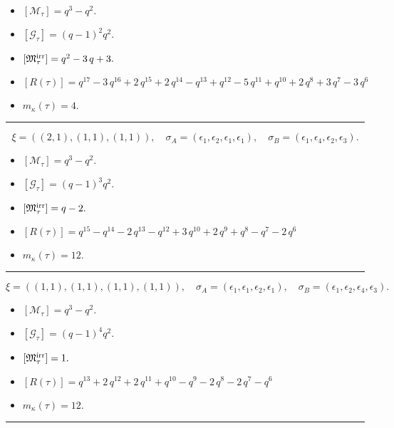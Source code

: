 \documentclass[10pt,a4paper]{amsart}
\begin{document}
\begin{itemize}
 \item $[\mathcal{M}_{\tau}] = q^{3} - q^{2} .$

 \item $[\mathcal{G}_{\tau}] = {\left(q - 1\right)}^{2} q^{2} .$

 \item $[{\frak M}_{\tau}^{\textrm{irr}}] = q^{2} - 3 \, q + 3 .$

 \item $[R(\tau)] = q^{17} - 3 \, q^{16} + 2 \, q^{15} + 2 \, q^{14} - q^{13} + q^{12} - 5 \, q^{11} + q^{10} + 2 \, q^{8} + 3 \, q^{7} - 3 \, q^{6} $

 \item $m_{\kappa}(\tau) = 4 .$

 \end{itemize}
\noindent\rule{8cm}{0.4pt}

$$\xi = ({(2, 1), (1, 1)}, {(1, 1)}),\quad \sigma_A = ({{\epsilon_1, \epsilon_2}, {\epsilon_1}}, {{\epsilon_1}}),\quad \sigma_B = ({{\epsilon_1, \epsilon_4}, {\epsilon_2}}, {{\epsilon_3}}).$$

\begin{itemize}
 \item $[\mathcal{M}_{\tau}] = q^{3} - q^{2} .$

 \item $[\mathcal{G}_{\tau}] = {\left(q - 1\right)}^{3} q^{2} .$

 \item $[{\frak M}_{\tau}^{\textrm{irr}}] = q - 2 .$

 \item $[R(\tau)] = q^{15} - q^{14} - 2 \, q^{13} - q^{12} + 3 \, q^{10} + 2 \, q^{9} + q^{8} - q^{7} - 2 \, q^{6} $

 \item $m_{\kappa}(\tau) = 12 .$

 \end{itemize}
\noindent\rule{8cm}{0.4pt}

$$\xi = ({(1, 1), (1, 1), (1, 1)}, {(1, 1)}),\quad \sigma_A = ({{\epsilon_1}, {\epsilon_1}, {\epsilon_2}}, {{\epsilon_1}}),\quad \sigma_B = ({{\epsilon_1}, {\epsilon_2}, {\epsilon_4}}, {{\epsilon_3}}).$$

\begin{itemize}
 \item $[\mathcal{M}_{\tau}] = q^{3} - q^{2} .$

 \item $[\mathcal{G}_{\tau}] = {\left(q - 1\right)}^{4} q^{2} .$

 \item $[{\frak M}_{\tau}^{\textrm{irr}}] = 1 .$

 \item $[R(\tau)] = q^{13} + 2 \, q^{12} + 2 \, q^{11} + q^{10} - q^{9} - 2 \, q^{8} - 2 \, q^{7} - q^{6} $

 \item $m_{\kappa}(\tau) = 12 .$

 \end{itemize}
\noindent\rule{8cm}{0.4pt}
\end{document}
